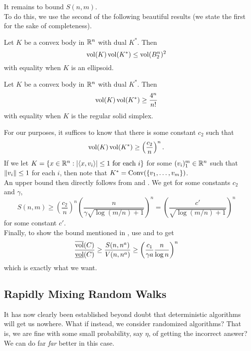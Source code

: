It remains to bound $S(n,m)$.\\

To do this, we use the second of the following beautiful results (we state the first for the sake of completeness).

\begin{theorem}
\label{santalo inequality}
Let $K$ be a convex body in $\mathbb{R}^n$ with dual $K^*$. Then
\[ \operatorname{vol}(K)\operatorname{vol}(K^*) \leq \operatorname{vol}(B_2^n)^2 \]
with equality when $K$ is an ellipsoid.
\end{theorem}

\begin{ftheo}
\label{inverse santalo inequality}
Let $K$ be a convex body in $\mathbb{R}^n$ with dual $K^*$. Then
\[ \operatorname{vol}(K)\operatorname{vol}(K^*) \geq \frac{4^n}{n!} \]
with equality when $K$ is the regular solid simplex.
\end{ftheo}

For our purposes, it suffices to know that there is some constant $c_2$ such that
\[ \operatorname{vol}(K)\operatorname{vol}(K^*) \geq \left(\frac{c_2}{n}\right)^n. \]
If we let $K=\{x\in\mathbb{R}^n:|\langle x,v_i\rangle| \leq 1\text{ for each $i$}\}$ for some $(v_i)_1^m\in\mathbb{R}^n$ such that $\left\lVert v_i\right\rVert\leq 1$ for each $i$, then note that $K^* = \operatorname{Conv}(\{v_1,\ldots,v_m\})$.\\
An upper bound then directly follows from  and . We get for some constants $c_2$ and $\gamma$,
\begin{equation}
\label{eqn: lower bound on S n m}
    S(n,m) \geq \left(\frac{c_2}{n}\right)^n \left(\frac{n}{\gamma\sqrt{ \log(m/n)+1}}\right)^n = \left(\frac{c'}{\sqrt{\log(m/n)+1}}\right)^n
\end{equation}
for some constant $c'$.\\

Finally, to show the bound mentioned in , use  and  to get
\[ \frac{\overline{\operatorname{vol}}(C)}{\underline{\operatorname{vol}}(C)} \geq \frac{S(n,n^a)}{V(n,n^a)} \geq \left(\frac{c_1}{\gamma a}\frac{n}{\log n}\right)^n \]
which is exactly what we want.

\subsection{Rapidly Mixing Random Walks}

It has now clearly been established beyond doubt that deterministic algorithms will get us nowhere. What if instead, we consider randomized algorithms? That is, we are fine with some small probability, say $\eta$, of getting the incorrect answer? We can do far \textit{far} better in this case.

